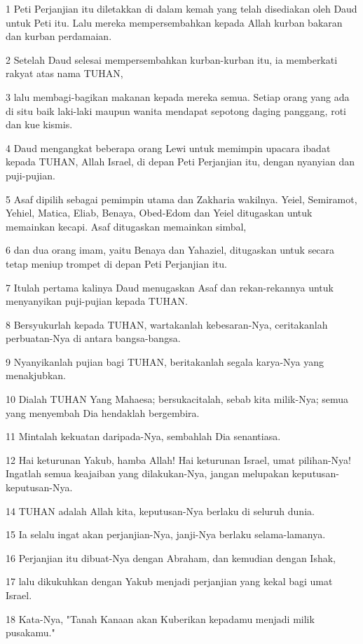 \par 1 Peti Perjanjian itu diletakkan di dalam kemah yang telah disediakan oleh Daud untuk Peti itu. Lalu mereka mempersembahkan kepada Allah kurban bakaran dan kurban perdamaian.
\par 2 Setelah Daud selesai mempersembahkan kurban-kurban itu, ia memberkati rakyat atas nama TUHAN,
\par 3 lalu membagi-bagikan makanan kepada mereka semua. Setiap orang yang ada di situ baik laki-laki maupun wanita mendapat sepotong daging panggang, roti dan kue kismis.
\par 4 Daud mengangkat beberapa orang Lewi untuk memimpin upacara ibadat kepada TUHAN, Allah Israel, di depan Peti Perjanjian itu, dengan nyanyian dan puji-pujian.
\par 5 Asaf dipilih sebagai pemimpin utama dan Zakharia wakilnya. Yeiel, Semiramot, Yehiel, Matica, Eliab, Benaya, Obed-Edom dan Yeiel ditugaskan untuk memainkan kecapi. Asaf ditugaskan memainkan simbal,
\par 6 dan dua orang imam, yaitu Benaya dan Yahaziel, ditugaskan untuk secara tetap meniup trompet di depan Peti Perjanjian itu.
\par 7 Itulah pertama kalinya Daud menugaskan Asaf dan rekan-rekannya untuk menyanyikan puji-pujian kepada TUHAN.
\par 8 Bersyukurlah kepada TUHAN, wartakanlah kebesaran-Nya, ceritakanlah perbuatan-Nya di antara bangsa-bangsa.
\par 9 Nyanyikanlah pujian bagi TUHAN, beritakanlah segala karya-Nya yang menakjubkan.
\par 10 Dialah TUHAN Yang Mahaesa; bersukacitalah, sebab kita milik-Nya; semua yang menyembah Dia hendaklah bergembira.
\par 11 Mintalah kekuatan daripada-Nya, sembahlah Dia senantiasa.
\par 12 Hai keturunan Yakub, hamba Allah! Hai keturunan Israel, umat pilihan-Nya! Ingatlah semua keajaiban yang dilakukan-Nya, jangan melupakan keputusan-keputusan-Nya.
\par 14 TUHAN adalah Allah kita, keputusan-Nya berlaku di seluruh dunia.
\par 15 Ia selalu ingat akan perjanjian-Nya, janji-Nya berlaku selama-lamanya.
\par 16 Perjanjian itu dibuat-Nya dengan Abraham, dan kemudian dengan Ishak,
\par 17 lalu dikukuhkan dengan Yakub menjadi perjanjian yang kekal bagi umat Israel.
\par 18 Kata-Nya, "Tanah Kanaan akan Kuberikan kepadamu menjadi milik pusakamu."
